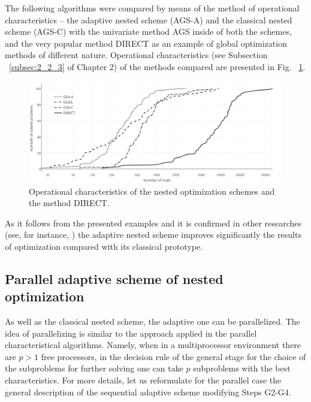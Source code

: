 The following algorithms were compared by means of the method of operational characteristics – the adaptive nested scheme (AGS-A) and the classical nested scheme (AGS-C) with the univariate method AGS inside of both the schemes, and the very popular method DIRECT \cite{5_Jones, 5_JonesPerttunenStuckman} as an example of global optimization methods of different nature. 
Operational characteristics (see Subsection ~\ref{subsec:2_2_3} of Chapter 2) of the methods compared are presented in Fig. ~\ref{fig:5_11}.
\begin{figure}[ht]
\centering
\includegraphics[width=1.0\linewidth]{figures/figure_5_11.pdf}
\caption{Operational characteristics of the nested optimization schemes and the method DIRECT.}
\label{fig:5_11}    
\end{figure}

As it follows from the presented examples and it is confirmed in other researches (see, for instance, \cite{5_GerGriGer, 5_GriIsrSergAIP, 5_GriIsrSergAMC}) the adaptive nested scheme improves significantly the results of optimization compared with its classical prototype. 

\subsection{Parallel adaptive scheme of nested optimization}
\label{subsec:5_4_3}
As well as the classical nested scheme, the adaptive one can be parallelized. The idea of parallelizing is similar to the approach applied in the parallel characteristical algorithms. Namely, when in a multiprocessor environment there are $p>1$ free processors, in the decision rule of the general stage for the choice of the subproblems for further solving one can take $p$ subproblems with the best characteristics. For more details, let us reformulate for the parallel case the general description of the sequential adaptive scheme modifying Steps G2-G4.

